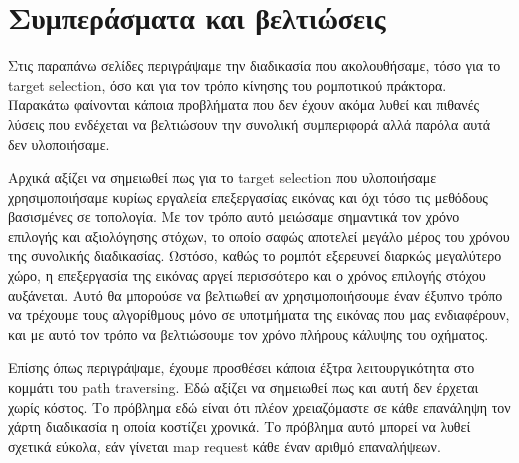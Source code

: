 \section*{Συμπεράσματα και βελτιώσεις}
Στις παραπάνω σελίδες περιγράψαμε την διαδικασία που ακολουθήσαμε, τόσο για το target selection, όσο και για τον τρόπο κίνησης του ρομποτικού πράκτορα. Παρακάτω φαίνονται κάποια προβλήματα που δεν έχουν ακόμα λυθεί και πιθανές λύσεις που ενδέχεται να βελτιώσουν την συνολική συμπεριφορά αλλά παρόλα αυτά δεν υλοποιήσαμε.


Αρχικά αξίζει να σημειωθεί πως για το target selection που υλοποιήσαμε χρησιμοποιήσαμε κυρίως εργαλεία επεξεργασίας εικόνας και όχι τόσο τις μεθόδους βασισμένες σε τοπολογία. Με τον τρόπο αυτό μειώσαμε σημαντικά τον χρόνο επιλογής και αξιολόγησης στόχων, το οποίο σαφώς αποτελεί μεγάλο μέρος του χρόνου της συνολικής διαδικασίας. Ωστόσο, καθώς το ρομπότ εξερευνεί διαρκώς μεγαλύτερο χώρο, η επεξεργασία της εικόνας αργεί περισσότερο και ο χρόνος επιλογής στόχου αυξάνεται. Αυτό θα μπορούσε να βελτιωθεί αν χρησιμοποιήσουμε έναν έξυπνο τρόπο να τρέχουμε τους αλγορίθμους μόνο σε υποτμήματα της εικόνας που μας ενδιαφέρουν, και με αυτό τον τρόπο να βελτιώσουμε τον χρόνο πλήρους κάλυψης του οχήματος.


Επίσης όπως περιγράψαμε, έχουμε προσθέσει κάποια έξτρα λειτουργικότητα στο κομμάτι του path traversing. Εδώ αξίζει να σημειωθεί πως και αυτή δεν έρχεται χωρίς κόστος. Το πρόβλημα εδώ είναι ότι πλέον χρειαζόμαστε σε κάθε επανάληψη τον χάρτη διαδικασία η οποία κοστίζει χρονικά. Το πρόβλημα αυτό μπορεί να λυθεί σχετικά εύκολα, εάν γίνεται map request κάθε έναν αριθμό επαναλήψεων.


